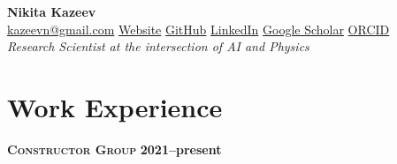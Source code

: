 \documentclass[11pt,a4paper]{article}
\begin{document}
\begin{center}
  {\LARGE\bfseries Nikita Kazeev}\\[3pt]
  {\small
    \href{mailto:kazeevn@gmail.com}{kazeevn@gmail.com} \textperiodcentered{}
    \href{https://kazeevn.github.io}{Website} \textperiodcentered{}
    \href{https://github.com/kazeevn}{GitHub} \textperiodcentered{}
    \href{https://linkedin.com/in/nikita-kazeev}{LinkedIn} \textperiodcentered{}
    \href{https://scholar.google.com/citations?user=vamy2okAAAAJ}{Google Scholar} \textperiodcentered{}
    \href{https://orcid.org/0000-0002-5699-7634}{ORCID}%
  }\\[5pt]
  \textit{ Research Scientist at the intersection of AI and Physics }
\end{center}

\section{Work Experience}
\textsc{\textbf{\boldmath{}Constructor Group}} \hfill\textbf{2021--present}\par
\smallskip
\end{document}
